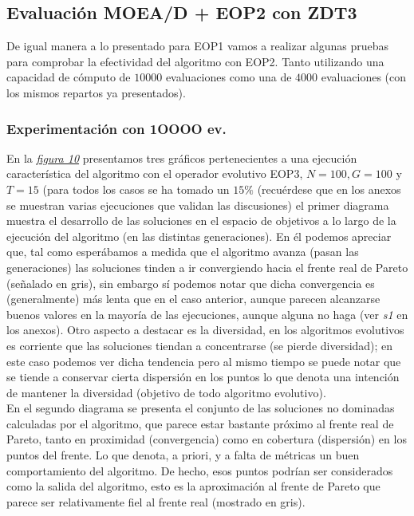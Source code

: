 
\subsection{Evaluación MOEA/D + EOP2 con ZDT3}

De igual manera a lo presentado para EOP1 vamos a realizar algunas pruebas para comprobar la efectividad del algoritmo con EOP2. Tanto utilizando una capacidad de cómputo de $10000$ evaluaciones como una de $4000$ evaluaciones (con los mismos repartos ya presentados).\\

\justify
\subsubsection{Experimentación con 1OOOO ev.}

En la \hyperref[fig:10]{\textit{figura 10}} presentamos tres gráficos pertenecientes a una ejecución característica del algoritmo con el operador evolutivo EOP3, $N=100, G=100$ y $T=15$ (para todos los casos se ha tomado un $15\%$  (recuérdese que en los anexos se muestran varias ejecuciones que validan las discusiones) el primer diagrama muestra el desarrollo de las soluciones en el espacio de objetivos a lo largo de la ejecución del algoritmo (en las distintas generaciones). En él podemos apreciar que, tal como esperábamos a medida que el algoritmo avanza (pasan las generaciones) las soluciones tinden a ir convergiendo hacia el frente real de Pareto (señalado en gris), sin embargo sí podemos notar que dicha convergencia es (generalmente) más lenta que en el caso anterior, aunque parecen alcanzarse buenos valores en la mayoría de las ejecuciones, aunque alguna no haga (ver \textit{s1} en los anexos). Otro aspecto a destacar es la diversidad, en los algoritmos evolutivos es corriente que las soluciones tiendan a concentrarse (se pierde diversidad); en este caso podemos ver dicha tendencia pero al mismo tiempo se puede notar que se tiende a conservar cierta dispersión en los puntos lo que denota una intención de mantener la diversidad (objetivo de todo algoritmo evolutivo).\\

En el segundo diagrama se presenta el conjunto de las soluciones no dominadas calculadas por el algoritmo, que parece estar bastante próximo al frente real de Pareto, tanto en proximidad (convergencia) como en cobertura (dispersión) en los puntos del frente. Lo que denota, a priori, y a falta de métricas un buen comportamiento del algoritmo. De hecho, esos puntos podrían ser considerados como la salida del algoritmo, esto es la aproximación al frente de Pareto que parece ser relativamente fiel al frente real (mostrado en gris).\\

